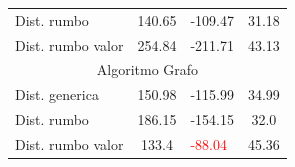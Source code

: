 \documentclass[12pt,a4paper]{article}
\begin{document}
\begin{table}[H]
\begin{tabular}{l|c|l|c|}
\rowcolor[rgb]{0.855,0.91,0.988} Dist. rumbo                           & 140.65                            & -109.47                             & \textcolor[rgb]{0,0.502,0}{31.18}  \\
\rowcolor[rgb]{0.925,0.957,1} Dist. rumbo valor                        & 254.84                            & -211.71                             & 43.13                              \\ 
\hline
\multicolumn{4}{c}{{\cellcolor[rgb]{0.796,0.808,0.984}}Algoritmo Grafo}                                                                                                               \\ 
\hline
\rowcolor[rgb]{0.925,0.957,1} Dist. generica                           & 150.98                            & -115.99                             & 34.99                              \\
\rowcolor[rgb]{0.855,0.91,0.988} Dist. rumbo                           & 186.15                            & -154.15                             & 32.0                               \\
\rowcolor[rgb]{0.925,0.957,1} Dist. rumbo valor                        & \textcolor[rgb]{0,0.502,0}{133.4} & \textcolor{red}{-88.04}             & 45.36                             
\end{tabular}
\end{table}

\pagebreak
\end{document}
